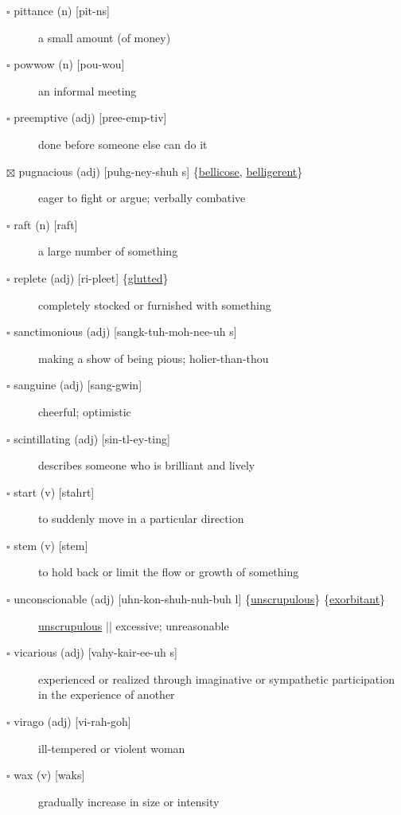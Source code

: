 \documentclass[11pt]{article}
\begin{document}
\begin{description}
\item[{$\square$ pittance (n) [pit-ns]}] a small amount (of money)
\item[{$\square$ powwow (n) [pou-wou]}] an informal meeting
\item[{$\square$ preemptive (adj) [pree-emp-tiv]}] done before someone else can do it
\item[{$\boxtimes$ \label{org20a75ac}pugnacious (adj) [puhg-ney-shuh s] \{\hyperref[orge39b955]{bellicose}, \hyperref[org16afac9]{belligerent}\}}] eager to fight or argue; verbally combative
\item[{$\square$ raft (n) [raft]}] a large number of something
\item[{$\square$ replete (adj) [ri-pleet] \{\hyperref[orgba662a0]{glutted}\}}] completely stocked or furnished with something
\item[{$\square$ sanctimonious (adj) [sangk-tuh-moh-nee-uh s]}] making a show of being pious; holier-than-thou
\item[{$\square$ sanguine (adj) [sang-gwin]}] cheerful; optimistic
\item[{$\square$ scintillating (adj) [sin-tl-ey-ting]}] describes someone who is brilliant and lively
\item[{$\square$ start (v) [stahrt]}] to suddenly move in a particular direction
\item[{$\square$ stem (v) [stem]}] to hold back or limit the flow or growth of something
\item[{$\square$ \label{org23bc9ff}unconscionable (adj) [uhn-kon-shuh-nuh-buh l] \{\hyperref[orgaf1efd8]{unscrupulous}\} \{\hyperref[orgb2266c8]{exorbitant}\}}] \hyperref[orgaf1efd8]{unscrupulous} || excessive; unreasonable
\item[{$\square$ vicarious (adj) [vahy-kair-ee-uh s]}] experienced or realized through imaginative or sympathetic participation in the experience of another
\item[{$\square$ virago (adj) [vi-rah-goh]}] ill-tempered or violent woman
\item[{$\square$ wax (v) [waks]}] gradually increase in size or intensity
\end{description}
\end{document}
